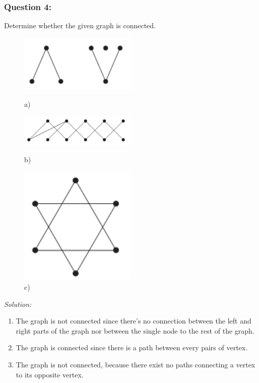\documentclass[a4paper]{article}
\begin{document}
	\subsubsection*{Question 4:}
	Determine whether the given graph is connected.
	\begin{figure}[H]
		\begin{minipage}{0.3\textwidth}
			\centering
			\includegraphics[width=0.5\textwidth]{tut94_1.png}
			\caption*{a)}
		\end{minipage}
		\begin{minipage}{0.3\textwidth}
			\centering
			\includegraphics[width=0.5\textwidth]{tut94_2.png}
			\caption*{b)}
		\end{minipage}
		\begin{minipage}{0.3\textwidth}
			\centering
			\includegraphics[width=0.5\textwidth]{tut94_3.png}
			\caption*{c)}
		\end{minipage}
	\end{figure}
	\textit{Solution:}
	\begin{enumerate}[label = \alph*)]
		\item 
		      The graph is not connected since there's no connection between the left and right parts of the graph nor between the single node to the rest of the graph.
		\item 
		      The graph is connected since there is a path between every pairs of vertex.
		\item 
		      The graph is not connected, because there exist no paths connecting a vertex to its opposite vertex.
	\end{enumerate}
	
\end{document}

